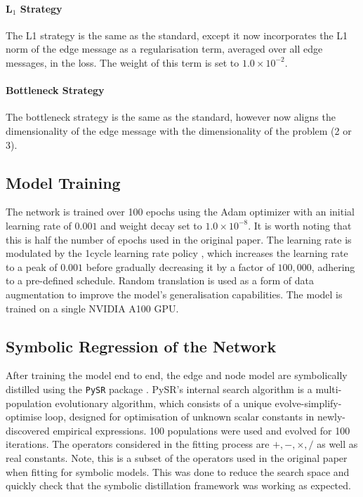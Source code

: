 \documentclass[11pt]{article}
\begin{document}
\paragraph*{L$_1$ Strategy}
The L1 strategy is the same as the standard, except it now incorporates the L1 norm of the edge message as a regularisation term, averaged over all edge messages, in the loss. The weight of this term is set to \(1.0 \times 10^{-2}\).

\paragraph*{Bottleneck Strategy}
The bottleneck strategy is the same as the standard, however now aligns the dimensionality of the edge message with the dimensionality of the problem (2 or 3).

\subsection{Model Training}
The network is trained over 100 epochs using the Adam optimizer with an initial learning rate of \(0.001\) and weight decay set to \(1.0 \times 10^{-8}\). It is worth noting that this is half the number of epochs used in the original paper. The learning rate is modulated by the 1cycle learning rate policy \cite{smith2018superconvergence}, which increases the learning rate to a peak of \(0.001\) before gradually decreasing it by a factor of \(100,000\), adhering to a pre-defined schedule. Random translation is used as a form of data augmentation to improve the model's generalisation capabilities. The model is trained on a single NVIDIA A100 GPU.

\subsection{Symbolic Regression of the Network}
After training the model end to end, the edge and node model are symbolically distilled using the \texttt{PySR} package \cite{cranmer2023interpretable}. PySR's internal search algorithm is a multi-population evolutionary algorithm, which consists of a unique evolve-simplify-optimise loop, designed for optimisation of unknown scalar constants in newly-discovered empirical expressions. 100 populations were used and evolved for 100 iterations. The operators considered in the fitting process are $ +, -, \times , /$ as well as real constants. Note, this is a subset of the operators used in the original paper when fitting for symbolic models. This was done to reduce the search space and quickly check that the symbolic distillation framework was working as expected.
\end{document}
